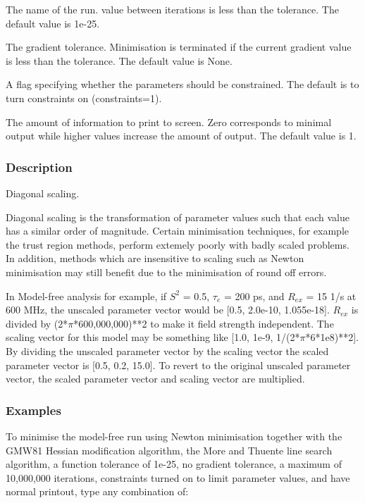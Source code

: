   The name of the run.
value between iterations is less than the tolerance.  The default value is 1e-25.

  The gradient tolerance.  Minimisation is terminated if the current gradient value is less than the tolerance.  The default value is None.

  A flag specifying whether the parameters should be constrained.  The default is to turn constraints on (constraints=1).


  The amount of information to print to screen.  Zero corresponds to minimal output while higher values increase the amount of output.  The default value is 1.

\subsubsection{Description}

Diagonal scaling.

Diagonal scaling is the transformation of parameter values such that each value has a
similar order of magnitude.  Certain minimisation techniques, for example the trust region
methods, perform extemely poorly with badly scaled problems.  In addition, methods which are
insensitive to scaling such as Newton minimisation may still benefit due to the minimisation
of round off errors.

In Model-free analysis for example, if $S^2$ = 0.5, $\tau_e$ = 200 ps, and $R_{ex}$ = 15 1/s at 600 MHz,
the unscaled parameter vector would be [0.5, 2.0e-10, 1.055e-18].  $R_{ex}$ is divided by
(2*$\pi$*600,000,000)**2 to make it field strength independent.  The scaling vector for this
model may be something like [1.0, 1e-9, 1/(2*$\pi$*6*1e8)**2].  By dividing the unscaled
parameter vector by the scaling vector the scaled parameter vector is [0.5, 0.2, 15.0].  To
revert to the original unscaled parameter vector, the scaled parameter vector and scaling
vector are multiplied.


\subsubsection{Examples}

To minimise the model-free run 
 using Newton minimisation together with the GMW81
Hessian modification algorithm, the More and Thuente line search algorithm, a function
tolerance of 1e-25, no gradient tolerance, a maximum of 10,000,000 iterations, constraints
turned on to limit parameter values, and have normal printout, type any combination of:

